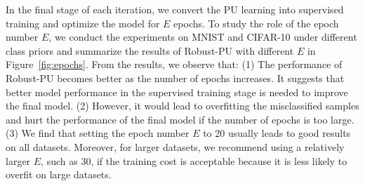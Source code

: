 \documentclass[sigconf]{acmart}
\newcommand{\ourmethod}{Robust-PU\xspace}
\begin{document}
In the final stage of each iteration, we convert the PU learning into supervised training and optimize the model for $E$ epochs. To study the role of the epoch number $E$, we conduct the experiments on MNIST and CIFAR-10 under different class priors and summarize the results of \ourmethod with different $E$ in Figure~\ref{fig:epochs}. From the results, we observe that: (1) The performance of \ourmethod becomes better as the number of epochs increases. It suggests that better model performance in the supervised training stage is needed to improve the final model. (2) However, it would lead to overfitting the misclassified samples and hurt the performance of the final model if the number of epochs is too large. (3) We find that setting the epoch number $E$ to 20 usually leads to good results on all datasets. Moreover, for larger datasets, we recommend using a relatively larger $E$, such as 30, if the training cost is acceptable because it is less likely to overfit on large datasets.
\end{document}
